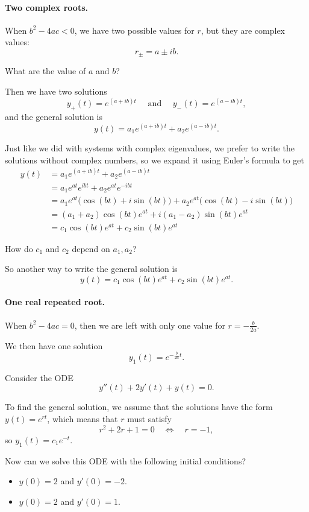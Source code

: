 \paragraph{\color{cyan}Two complex roots.} When $b^2-4ac<0$, we have two possible values for $r$, but they are complex values:
$$
r_{\pm} = a \pm ib.
$$
\begin{graybox}
What are the value of $a$ and $b$?	
\end{graybox}

Then we have two solutions
$$
y_{+}(t) = e^{(a+ib) t} \quad \text{ and } \quad y_{-}(t) = e^{(a-ib) t},
$$
and the general solution is
$$
y(t) = a_1 e^{(a+ib) t}  + a_2 e^{(a-ib) t}.
$$

Just like we did with systems with complex eigenvalues, we prefer to write the solutions without complex numbers, so we expand it using Euler's formula to get
\begin{align*}
y(t) 	& = a_1 e^{(a+ib) t}  + a_2 e^{(a-ib) t} \\
		& = a_1 e^{at}e^{ibt}  + a_2 e^{at}e^{-ibt} \\
		& = a_1 e^{at} \big( \cos(bt) + i \sin(bt) \big)  + a_2 e^{at} \big( \cos(bt) - i \sin(bt) \big) \\
		& = (a_1+a_2)  \cos(bt)e^{at} + i (a_1-a_2)\sin(bt) e^{at} \\
		& = c_1 \cos(bt)e^{at} + c_2\sin(bt) e^{at}
\end{align*}

\begin{graybox}
How do $c_1$ and $c_2$ depend on $a_1,a_2$?	
\end{graybox}

So another way to write the general solution is
$$
y(t) = c_1 \cos(bt)e^{at} + c_2\sin(bt) e^{at}.
$$






\paragraph{\color{cyan}One real repeated root.} When $b^2-4ac=0$, then we are left with only one value for $r=-\frac{b}{2a}$.

We then have one solution
$$
y_1(t) = e^{-\frac{b}{2a}t}.
$$

\begin{example}
Consider the ODE 
$$
y''(t) + 2y'(t) + y(t) = 0.
$$	

To find the general solution, we assume that the solutions have the form $y(t) = e^{rt}$, which means that $r$ must satisfy
$$
r^2 +2r+1 = 0 
	\quad \Leftrightarrow \quad r=-1,
$$
so $y_1(t) = c_1 e^{-t}$.

Now can we solve this ODE with the following initial conditions?
\begin{itemize}
	\item $y(0)=2$ and $y'(0)=-2$.
	\item $y(0)=2$ and $y'(0)=1$.
\end{itemize}
\end{example}

